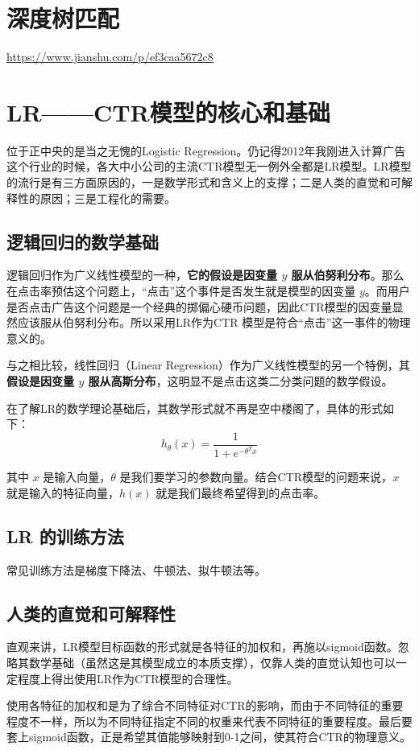 \documentclass[12pt]{article}
\begin{document}
\section{深度树匹配}
\url{https://www.jianshu.com/p/ef3caa5672c8}

\section{LR——CTR模型的核心和基础}
位于正中央的是当之无愧的Logistic Regression。仍记得2012年我刚进入计算广告这个行业的时候，各大中小公司的主流CTR模型无一例外全都是LR模型。LR模型的流行是有三方面原因的，一是数学形式和含义上的支撑；二是人类的直觉和可解释性的原因；三是工程化的需要。

\subsection{逻辑回归的数学基础}
逻辑回归作为广义线性模型的一种，\textbf{它的假设是因变量 $y$ 服从伯努利分布}。那么在点击率预估这个问题上，“点击”这个事件是否发生就是模型的因变量 $y$。而用户是否点击广告这个问题是一个经典的掷偏心硬币问题，因此CTR模型的因变量显然应该服从伯努利分布。所以采用LR作为CTR 模型是符合“点击”这一事件的物理意义的。

与之相比较，线性回归（Linear Regression）作为广义线性模型的另一个特例，其\textbf{假设是因变量 $y$ 服从高斯分布}，这明显不是点击这类二分类问题的数学假设。

在了解LR的数学理论基础后，其数学形式就不再是空中楼阁了，具体的形式如下：
$$
h_\theta(x) = \frac{1}{1 + e^{-\theta^Tx}}
$$

其中 $x$ 是输入向量，$\theta$ 是我们要学习的参数向量。结合CTR模型的问题来说，$x$ 就是输入的特征向量，$h(x)$ 就是我们最终希望得到的点击率。

\subsection{LR 的训练方法}
常见训练方法是梯度下降法、牛顿法、拟牛顿法等。

\subsection{人类的直觉和可解释性}
直观来讲，LR模型目标函数的形式就是各特征的加权和，再施以sigmoid函数。忽略其数学基础（虽然这是其模型成立的本质支撑），仅靠人类的直觉认知也可以一定程度上得出使用LR作为CTR模型的合理性。

使用各特征的加权和是为了综合不同特征对CTR的影响，而由于不同特征的重要程度不一样，所以为不同特征指定不同的权重来代表不同特征的重要程度。最后要套上sigmoid函数，正是希望其值能够映射到0-1之间，使其符合CTR的物理意义。
\end{document}
